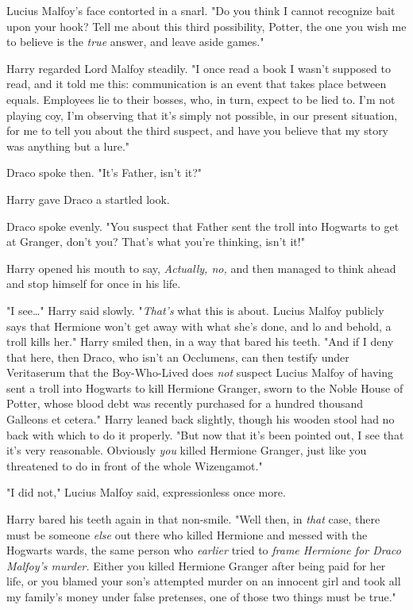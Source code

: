 Lucius Malfoy's face contorted in a snarl. "Do you think I cannot recognize
bait upon your hook? Tell me about this third possibility, Potter, the one you
wish me to believe is the \emph{true} answer, and leave aside games."

Harry regarded Lord Malfoy steadily. "I once read a book I wasn't supposed to
read, and it told me this: communication is an event that takes place between
equals. Employees lie to their bosses, who, in turn, expect to be lied to. I'm
not playing coy, I'm observing that it's simply not possible, in our present
situation, for me to tell you about the third suspect, and have you believe
that my story was anything but a lure."

Draco spoke then. "It's Father, isn't it?"

Harry gave Draco a startled look.

Draco spoke evenly. "You suspect that Father sent the troll into Hogwarts to
get at Granger, don't you? That's what you're thinking, isn't it!"

Harry opened his mouth to say, \emph{Actually, no,} and then managed to think
ahead and stop himself for once in his life.

"I see{\ldots}" Harry said slowly. "\emph{That's} what this is about. Lucius
Malfoy publicly says that Hermione won't get away with what she's done, and lo
and behold, a troll kills her." Harry smiled then, in a way that bared his
teeth. "And if I deny that here, then Draco, who isn't an Occlumens, can then
testify under Veritaserum that the Boy-Who-Lived does \emph{not} suspect Lucius
Malfoy of having sent a troll into Hogwarts to kill Hermione Granger, sworn to
the Noble House of Potter, whose blood debt was recently purchased for a
hundred thousand Galleons et cetera." Harry leaned back slightly, though his
wooden stool had no back with which to do it properly. "But now that it's been
pointed out, I see that it's very reasonable. Obviously \emph{you} killed
Hermione Granger, just like you threatened to do in front of the whole
Wizengamot."

"I did not," Lucius Malfoy said, expressionless once more.

Harry bared his teeth again in that non-smile. "Well then, in \emph{that} case,
there must be someone \emph{else} out there who killed Hermione and messed with
the Hogwarts wards, the same person who \emph{earlier} tried to \emph{frame
Hermione for Draco Malfoy's murder.} Either you killed Hermione Granger after
being paid for her life, or you blamed your son's attempted murder on an
innocent girl and took all my family's money under false pretenses, one of
those two things must be true."

